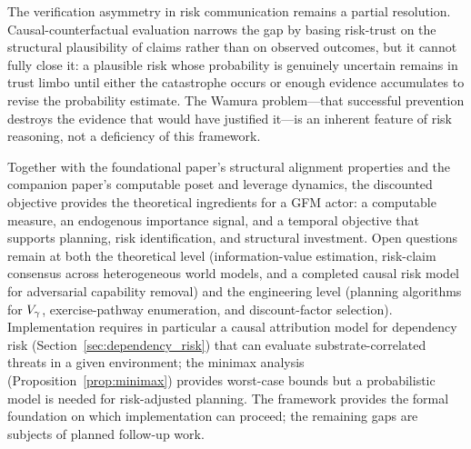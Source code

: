 The verification asymmetry in risk communication remains a partial resolution.
Causal-counterfactual evaluation narrows the gap by basing risk-trust on the
structural plausibility of claims rather than on observed outcomes, but it
cannot fully close it: a plausible risk whose probability is genuinely
uncertain remains in trust limbo until either the catastrophe occurs or
enough evidence accumulates to revise the probability estimate. The Wamura
problem---that successful prevention destroys the evidence that would have
justified it---is an inherent feature of risk reasoning, not a deficiency of
this framework.

Together with the foundational paper's structural alignment properties and the
companion paper's computable poset and leverage dynamics, the discounted
objective provides the theoretical ingredients for a GFM actor: a computable
measure, an endogenous importance signal, and a temporal objective that
supports planning, risk identification, and structural investment. Open
questions remain at both the theoretical level (information-value
estimation, risk-claim consensus across heterogeneous world models, and a
completed causal risk model for adversarial capability removal) and the
engineering level (planning algorithms for $V_\gamma$, exercise-pathway
enumeration, and discount-factor selection). Implementation requires in
particular a causal attribution model for dependency risk
(Section~\ref{sec:dependency_risk}) that can evaluate substrate-correlated
threats in a given environment; the minimax analysis
(Proposition~\ref{prop:minimax}) provides worst-case bounds but a
probabilistic model is needed for risk-adjusted planning. The framework
provides the formal foundation on which implementation can proceed; the
remaining gaps are subjects of planned follow-up work.
